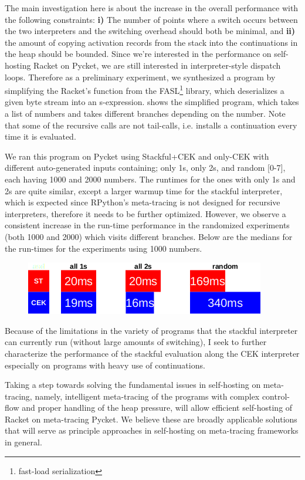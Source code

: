 The main investigation here is about the increase in the overall
performance with the following constraints: \textbf{i)} The number of
points where a switch occurs between the two interpreters and the
switching overhead should both be minimal, and \textbf{ii)} the amount
of copying activation records from the stack into the continuations in
the heap should be bounded. Since we're interested in the performance
on self-hosting Racket on Pycket, we are still interested in
interpreter-style dispatch loops. Therefore as a preliminary
experiment, we synthesized a program by simplifying the Racket's
 function from the FASL\footnote{fast-load
  serialization} library, which deserializes a given byte stream into
an s-expression.  shows the simplified program,
which takes a list of numbers and takes different branches depending
on the number. Note that some of the recursive calls are not
tail-calls, i.e. installs a continuation every time it is evaluated.

We ran this program on Pycket using Stackful+CEK and only-CEK with
different auto-generated inputs containing; only 1s, only 2s, and
random [0-7], each having 1000 and 2000 numbers. The runtimes for the
ones with only 1s and 2s are quite similar, except a larger warmup
time for the stackful interpreter, which is expected since RPython's
meta-tracing is not designed for recursive interpreters, therefore it
needs to be further optimized. However, we observe a consistent
increase in the run-time performance in the randomized experiments
(both 1000 and 2000) which visits different branches. Below are the
medians for the run-times for the experiments using 1000 numbers.
\vspace{-0.3cm}
\begin{figure}[h]
  \centering
  \includegraphics[scale=0.5]{img/stackful2}
\end{figure}

\vspace{-0.2cm}

Because of the limitations in the variety of programs that the
stackful interpreter can currently run (without large amounts of
switching), I seek to further characterize the performance of the
stackful evaluation along the CEK interpreter especially on programs
with heavy use of continuations.

Taking a step towards solving the fundamental issues in self-hosting
on meta-tracing, namely, intelligent meta-tracing of the programs with
complex control-flow and proper handling of the heap pressure, will
allow efficient self-hosting of Racket on meta-tracing Pycket. We
believe these are broadly applicable solutions that will serve as
principle approaches in self-hosting on meta-tracing frameworks in
general.

